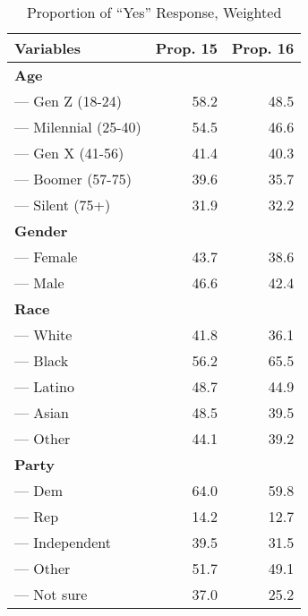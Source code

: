 \begin{table}[ht]
\centering
\begin{tabular}{lrr}
  \toprule
{\textbf{Variables}} & {\textbf{Prop. 15}} & {\textbf{Prop. 16}} \\ 
  \midrule 
 \textbf{ Age } & \\
--- Gen Z (18-24) & 58.2 & 48.5 \\ 
  --- Milennial (25-40) & 54.5 & 46.6 \\ 
  --- Gen X (41-56) & 41.4 & 40.3 \\ 
  --- Boomer (57-75) & 39.6 & 35.7 \\ 
  --- Silent (75+) & 31.9 & 32.2 \\ 
   \midrule 
 \textbf{ Gender } & \\
--- Female & 43.7 & 38.6 \\ 
  --- Male & 46.6 & 42.4 \\ 
   \midrule 
 \textbf{ Race } & \\
--- White & 41.8 & 36.1 \\ 
  --- Black & 56.2 & 65.5 \\ 
  --- Latino & 48.7 & 44.9 \\ 
  --- Asian & 48.5 & 39.5 \\ 
  --- Other & 44.1 & 39.2 \\ 
   \midrule 
 \textbf{ Party } & \\
--- Dem & 64.0 & 59.8 \\ 
  --- Rep & 14.2 & 12.7 \\ 
  --- Independent & 39.5 & 31.5 \\ 
  --- Other & 51.7 & 49.1 \\ 
  --- Not sure & 37.0 & 25.2 \\ 
   \bottomrule
\end{tabular}
\caption{Proportion of ``Yes'' Response, Weighted} 
\label{tab:desc}
\end{table}
